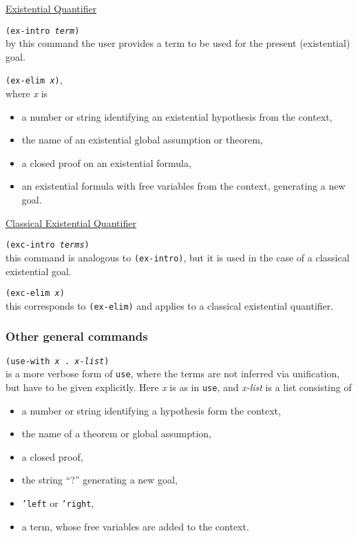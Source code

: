 \documentclass[12pt]{amsart}
\newcommand{\inquotes}[1]{``#1''}
\begin{document}
\underline{Existential Quantifier}

\texttt{(ex-intro \textsl{term})}\\
by this command the user provides a term to be used for
the present (existential) goal.

\texttt{(ex-elim \textsl{x})},\\
where \textsl{x} is
\begin{itemize}
\item a number or string identifying an existential hypothesis from
  the context,
\item the name of an existential global assumption or theorem,
\item a closed proof on an existential formula,
\item an existential formula with free variables from the context,
  genera\-ting a new goal.
\end{itemize}

\underline{Classical Existential Quantifier}

\texttt{(exc-intro \textsl{terms})}\\
this command is analogous to \texttt{(ex-intro)}, but
it is used in the case of a classical existential goal.

\texttt{(exc-elim \textsl{x})}\\
this corresponds to \texttt{(ex-elim)} and applies to a classical
existential quantifier.

\subsubsection{Other general commands}

\texttt{(use-with \textsl{x} . \textsl{x-list})}
\\
is a more verbose form of \texttt{use}, where the terms are not
inferred via unification, but have to be given explicitly. Here
\textsl{x} is as in \texttt{use}, and \textsl{x-list} is a list
consisting of
\begin{itemize}
\item a number or string identifying a hypothesis form the context,
\item the name of a theorem or global assumption,
\item a closed proof,
\item the string \inquotes{?}  generating a new goal,
\item \texttt{'left} or \texttt{'right},
\item a term, whose free variables are added to the context.
\end{itemize}
\end{document}
